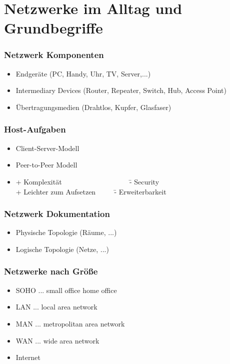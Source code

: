 \chapter{Netzwerke im Alltag und Grundbegriffe}
\subsection*{Netzwerk Komponenten}
\begin{itemize}
	\item Endgeräte (PC, Handy, Uhr, TV, Server,...)
	\item Intermediary Devices (Router, Repeater, Switch, Hub, Access Point)
	\item Übertragungsmedien (Drahtlos, Kupfer, Glasfaser)
\end{itemize}

\subsection*{Host-Aufgaben}
\begin{itemize}
	\item Client-Server-Modell
	\item Peer-to-Peer Modell
	\item[] \begin{tabbing}
		+ Komplexität ~~~~~~~~~~~~~~~~~~ \= - Security\\
		+ Leichter zum Aufsetzen ~~~~ \= - Erweiterbarkeit\\
	\end{tabbing}
\end{itemize}

\subsection*{Netzwerk Dokumentation}
\begin{itemize}
	\item Physische Topologie (Räume, ...)
	\item Logische Topologie (Netze, ...)
\end{itemize}

\subsection*{Netzwerke nach Größe}
\begin{itemize}
	\item SOHO ... small office home office
	\item LAN ... local area network
	\item MAN ... metropolitan area network
	\item WAN ... wide area network
	\item Internet
\end{itemize}


